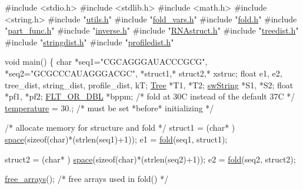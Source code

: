 \begin{DoxyCodeInclude}
\textcolor{preprocessor}{#include  <stdio.h>}
\textcolor{preprocessor}{#include  <stdlib.h>}
\textcolor{preprocessor}{#include  <math.h>}
\textcolor{preprocessor}{#include  <string.h>}
\textcolor{preprocessor}{#include  "\hyperlink{utils_8h}{utils.h}"}
\textcolor{preprocessor}{#include  "\hyperlink{fold__vars_8h}{fold\_vars.h}"}
\textcolor{preprocessor}{#include  "\hyperlink{fold_8h}{fold.h}"}
\textcolor{preprocessor}{#include  "\hyperlink{part__func_8h}{part\_func.h}"}
\textcolor{preprocessor}{#include  "\hyperlink{inverse_8h}{inverse.h}"}
\textcolor{preprocessor}{#include  "\hyperlink{RNAstruct_8h}{RNAstruct.h}"}
\textcolor{preprocessor}{#include  "\hyperlink{treedist_8h}{treedist.h}"}
\textcolor{preprocessor}{#include  "\hyperlink{stringdist_8h}{stringdist.h}"}
\textcolor{preprocessor}{#include  "\hyperlink{profiledist_8h}{profiledist.h}"}

\textcolor{keywordtype}{void} main()
\{
   \textcolor{keywordtype}{char} *seq1=\textcolor{stringliteral}{"CGCAGGGAUACCCGCG"}, *seq2=\textcolor{stringliteral}{"GCGCCCAUAGGGACGC"},
        *struct1,* struct2,* xstruc;
   \textcolor{keywordtype}{float} e1, e2, tree\_dist, string\_dist, profile\_dist, kT;
   \hyperlink{structTree}{Tree} *T1, *T2;
   \hyperlink{structswString}{swString} *S1, *S2;
   \textcolor{keywordtype}{float} *pf1, *pf2;
   \hyperlink{group__data__structures_ga31125aeace516926bf7f251f759b6126}{FLT\_OR\_DBL} *bppm;
   \textcolor{comment}{/* fold at 30C instead of the default 37C */}
   \hyperlink{group__model__details_gab4b11c8d9c758430960896bc3fe82ead}{temperature} = 30.;      \textcolor{comment}{/* must be set *before* initializing  */}

   \textcolor{comment}{/* allocate memory for structure and fold */}
   struct1 = (\textcolor{keywordtype}{char}* ) \hyperlink{utils_8h_ad7e1e137b3bf1f7108933d302a7f0177}{space}(\textcolor{keyword}{sizeof}(\textcolor{keywordtype}{char})*(strlen(seq1)+1));
   e1 =  \hyperlink{group__mfe__fold__single_gaadafcb0f140795ae62e5ca027e335a9b}{fold}(seq1, struct1);

   struct2 = (\textcolor{keywordtype}{char}* ) \hyperlink{utils_8h_ad7e1e137b3bf1f7108933d302a7f0177}{space}(\textcolor{keyword}{sizeof}(\textcolor{keywordtype}{char})*(strlen(seq2)+1));
   e2 =  \hyperlink{group__mfe__fold__single_gaadafcb0f140795ae62e5ca027e335a9b}{fold}(seq2, struct2);

   \hyperlink{group__mfe__fold__single_ga107fdfe5fd641868156bfd849f6866c7}{free\_arrays}();     \textcolor{comment}{/* free arrays used in fold() */}


\end{DoxyCodeInclude}
